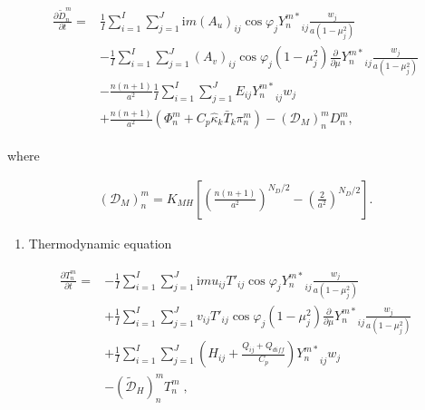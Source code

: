 \begin{eqnarray}
\begin{aligned}
  \frac{\partial{\tilde{D}_n^m}}{\partial {t}}
   = & \frac{1}{I} \sum_{i=1}^{I} \sum_{j=1}^{J}
          \mathrm{i}m (A_u)_{ij} \cos\varphi_j
          {Y_n^{m *}}_{ij}
         \frac{w_j}{a(1-\mu_j^{2})}
          \\
    & -    \frac{1}{I} \sum_{i=1}^{I} \sum_{j=1}^{J}
          (A_v)_{ij} \cos\varphi_j
          (1-\mu_j^2)
          \frac{\partial }{\partial \mu} {Y_n^{m *}}_{ij}
          \frac{w_j}{a(1-\mu_j^{2})}
          \\
    & -   \frac{n(n+1)}{a^{2}}
         \frac{1}{I} \sum_{i=1}^{I} \sum_{j=1}^{J}
          E_{ij} {Y_n^{m *}}_{ij} w_j
          \\
    & +   \frac{n(n+1)}{a^{2}}
          ( \Phi_n^m + C_{p} \hat{\kappa}_k \bar{T}_k \pi_n^m )
          -  ({\mathcal D}_M)_n^m D_n^m  ,
\end{aligned}
\end{eqnarray}

where

\begin{eqnarray}
({\mathcal D}_M)_n^m = K_{MH} \left[
                            \left( \frac{n(n+1)}{a^{2}} \right)^{N_D/2}
                            - \left( \frac{2}{a^2} \right)^{N_D/2}
                            \right]  .
\end{eqnarray}

\begin{enumerate}
\def\labelenumi{\arabic{enumi}.}
\setcounter{enumi}{2}
\tightlist
\item
  Thermodynamic equation
\end{enumerate}

\begin{eqnarray}
\begin{aligned}
  \frac{\partial{T_n^m}}{\partial {t}}
   =  & - \frac{1}{I} \sum_{i=1}^{I} \sum_{j=1}^{J}
          \mathrm{i}m u_{ij} T'_{ij} \cos\varphi_j
          {Y_n^{m *}}_{ij}
         \frac{w_j}{a(1-\mu_j^{2})}
          \\
     & + \frac{1}{I} \sum_{i=1}^{I} \sum_{j=1}^{J}
          v_{ij} T'_{ij} \cos\varphi_j
          (1-\mu_j^2)
          \frac{\partial }{\partial \mu} {Y_n^{m *}}_{ij}
          \frac{w_j}{a(1-\mu_j^{2})}
          \\
     & + \frac{1}{I} \sum_{i=1}^{I} \sum_{j=1}^{J}
          \left( H_{ij} + \frac{Q_{ij}+Q_{diff}}{C_{p}} \right)
          {Y_n^{m *}}_{ij} w_j
          \\
     & - (\tilde{\mathcal D}_H)_n^m T_n^m \; ,
\end{aligned}
\end{eqnarray}

